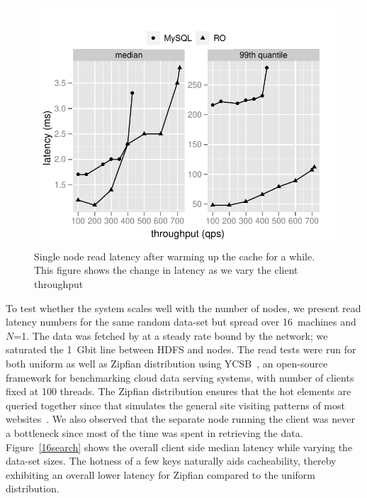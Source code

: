 \begin{figure}
  \centering
    \includegraphics[scale=0.55]{images/mysql_vs_read.pdf}
  \caption{Single node read latency after warming up the cache for a while. This figure shows the change in latency as we vary the client throughput}
  \label{mysql:search}
\end{figure}

To test whether the system scales well with the number of nodes, we
present read latency numbers for the same random data-set but spread
over 16~machines and $N$=1. The data was fetched by \projectname{} at a steady
rate bound by the network; we saturated the 1~Gbit line between HDFS
and \projectname{} nodes. The read tests were run for both uniform as well as
Zipfian distribution using YCSB~\cite{ycsb}, an open-source framework 
for benchmarking cloud data serving systems, with number of clients fixed
at 100 threads. The Zipfian distribution ensures that the hot elements are 
queried together since that simulates the general site visiting patterns 
of most websites~\cite{zipf}. We also observed that the separate node
running the client was never a bottleneck since most of the time was
spent in retrieving the data.
Figure~\ref{16search} shows the overall client side median latency while varying 
the data-set sizes. The hotness of a few keys naturally aids cacheability, 
thereby exhibiting an overall lower latency for Zipfian compared to 
the uniform distribution. 

